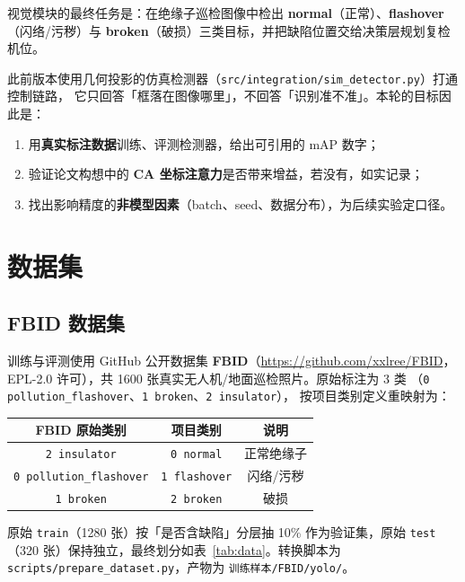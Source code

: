 \documentclass[UTF8,a4paper,11pt]{ctexart}
\begin{document}
视觉模块的最终任务是：在绝缘子巡检图像中检出 \textbf{normal}（正常）、\textbf{flashover}
（闪络/污秽）与 \textbf{broken}（破损）三类目标，并把缺陷位置交给决策层规划复检机位。

此前版本使用几何投影的仿真检测器（\texttt{src/integration/sim\_detector.py}）打通控制链路，
它只回答「框落在图像哪里」，不回答「识别准不准」。本轮的目标因此是：

\begin{enumerate}[label=(\arabic*)]
  \item 用\textbf{真实标注数据}训练、评测检测器，给出可引用的 mAP 数字；
  \item 验证论文构想中的 \textbf{CA 坐标注意力}是否带来增益，若没有，如实记录；
  \item 找出影响精度的\textbf{非模型因素}（batch、seed、数据分布），为后续实验定口径。
\end{enumerate}

\section{数据集}

\subsection{FBID 数据集}

训练与评测使用 GitHub 公开数据集 \textbf{FBID}（\url{https://github.com/xxlree/FBID}，
EPL-2.0 许可），共 1600 张真实无人机/地面巡检照片。原始标注为 3 类
（\texttt{0 pollution\_flashover}、\texttt{1 broken}、\texttt{2 insulator}），
按项目类别定义重映射为：

\begin{center}
\begin{tabular}{ccc}
\toprule
FBID 原始类别 & 项目类别 & 说明 \\
\midrule
\texttt{2 insulator} & \texttt{0 normal} & 正常绝缘子 \\
\texttt{0 pollution\_flashover} & \texttt{1 flashover} & 闪络/污秽 \\
\texttt{1 broken} & \texttt{2 broken} & 破损 \\
\bottomrule
\end{tabular}
\end{center}

原始 \texttt{train}（1280 张）按「是否含缺陷」分层抽 10\% 作为验证集，原始 \texttt{test}
（320 张）保持独立，最终划分如表~\ref{tab:data}。转换脚本为
\texttt{scripts/prepare\_dataset.py}，产物为 \texttt{训练样本/FBID/yolo/}。
\end{document}
